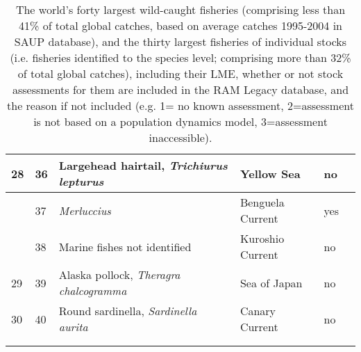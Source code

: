 \begin{longtable}{p{2cm} | p{2cm} | p{5cm} | l | p{2cm} | p{2cm}}
28 & 36& Largehead hairtail, \textit{Trichiurus lepturus} & Yellow Sea & no & \\ \hline
 & 37& \textit{Merluccius} & Benguela Current & yes & \\
 & 38& Marine fishes not identified & Kuroshio Current & no & \\
29 & 39& Alaska pollock, \textit{Theragra chalcogramma} & Sea of Japan & no & \\ \hline
30 & 40& Round sardinella, \textit{Sardinella aurita} & Canary Current & no & \\ \hline
\caption{The world's forty largest wild-caught fisheries (comprising less than 41\% of total global catches, based on average catches 1995-2004 in SAUP database), and the thirty largest fisheries of individual stocks (i.e. fisheries identified to the species level; comprising more than 32\% of total global catches), including their LME, whether or not stock assessments for them are included in the RAM Legacy database, and the reason if not included (e.g. 1= no known assessment, 2=assessment is not based on a population dynamics model, 3=assessment inaccessible).}\\
\label{tab:worldfisheries}
\end{longtable}





